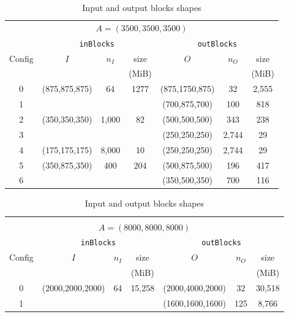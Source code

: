 \documentclass[sigconf, nonacm]{acmart}
\begin{document}
\begin{table}
  \setlength{\tabcolsep}{2pt}
  \centering
  \caption{Input and output blocks shapes}
  \vspace*{-0.5cm}
   \begin{tabular}{c|ccc|ccc}
    \multicolumn{7}{c}{$A=(3500,3500,3500)$}\\
   \rowcolor{black!25}
          & \multicolumn{3}{c|}{\texttt{inBlocks}} & \multicolumn{3}{c}{\texttt{outBlocks}} \\
    \rowcolor{black!25}
  Config &      $I$      & $n_I$  & size &      $O$       & $n_O$  & size  \\
  \rowcolor{black!25}
     &               &        & (MiB)&                &        & (MiB) \\
   \hline
   0 & (875,875,875) & 64     & 1277    & (875,1750,875) & 32     &  2,555 \\
   1 &               &        &           & (700,875,700)  & 100    & 818 \\
   \rowcolor{black!10}
   2 & (350,350,350) &1,000   & 82        & (500,500,500)  & 343    & 238 \\
   \rowcolor{black!10}
   3 &               &        &           & (250,250,250)  & 2,744  & 29  \\
   4 & (175,175,175) &8,000   & 10        & (250,250,250)  & 2,744  & 29 \\
   \rowcolor{black!10}
   5 & (350,875,350) &400     & 204       & (500,875,500)  & 196    & 417 \\
   \rowcolor{black!10}
   6 &               &        &           & (350,500,350)  & 700    & 116 \\
   \end{tabular}
   \hfill
   \begin{tabular}{c|ccc|ccc}
    \multicolumn{7}{c}{}\\
    \multicolumn{7}{c}{$A=(8000,8000,8000)$}\\
   \rowcolor{black!25}
          & \multicolumn{3}{c|}{\texttt{inBlocks}} & \multicolumn{3}{c}{\texttt{outBlocks}} \\
    \rowcolor{black!25}
  Config &      $I$      & $n_I$  & size &      $O$       & $n_O$  & size  \\
  \rowcolor{black!25}
     &               &        & (MiB)&                &        & (MiB) \\
   \hline
   0 & (2000,2000,2000) & 64     & 15,258    & (2000,4000,2000) & 32     &  30,518 \\
   1 &               &        &           & (1600,1600,1600)  & 125    & 8,766 \\

\end{tabular}
\end{table}
\end{document}
